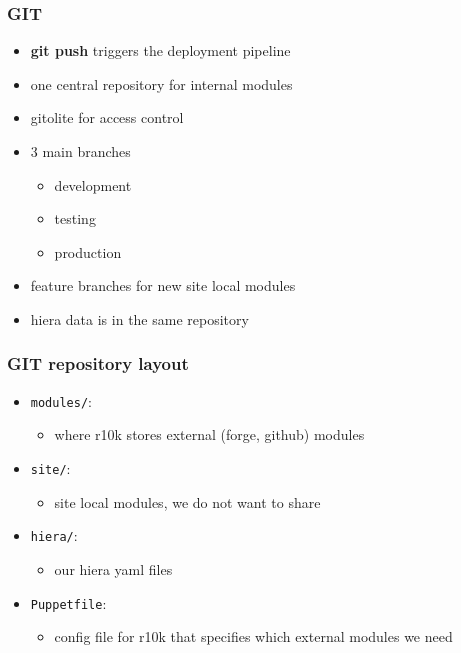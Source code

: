 \documentclass{beamer}
\begin{document}
\begin{frame}
  \frametitle{GIT}

  \begin{itemize}
  \item \textbf{git push} triggers the deployment pipeline
  \item one central repository for internal modules
  \item gitolite for access control
  \item 3 main branches
    \begin{itemize}
    \item development
    \item testing
    \item production
    \end{itemize}
  \item feature branches for new site local modules
  \item hiera data is in the same repository
  \end{itemize}
\end{frame}

\begin{frame}
  \frametitle{GIT repository layout}

  \begin{itemize}
  \item \texttt{modules/}:
    \begin{itemize}
    \item where r10k stores external (forge, github) modules
    \end{itemize}
  \item \texttt{site/}:
    \begin{itemize}
    \item site local modules, we do not want to share
    \end{itemize}
  \item \texttt{hiera/}:
    \begin{itemize}
    \item our hiera yaml files
    \end{itemize}
  \item \texttt{Puppetfile}:
    \begin{itemize}
    \item config file for r10k that specifies which external modules we need
    \end{itemize}
  \end{itemize}
\end{frame}
\end{document}
